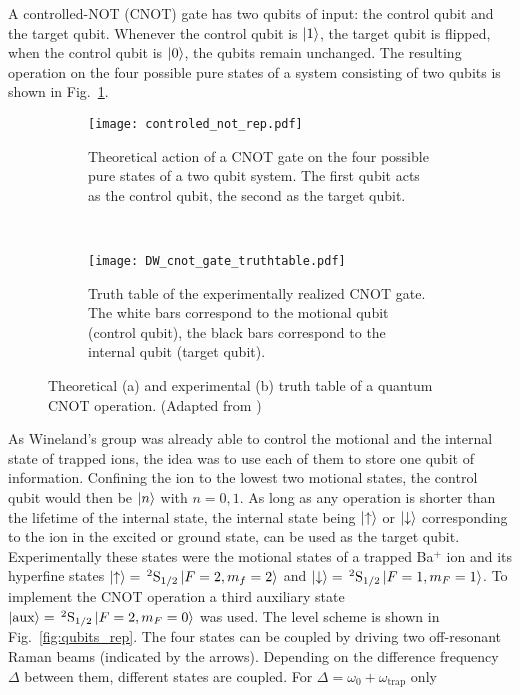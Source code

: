 A controlled-NOT (CNOT) gate has two qubits of input: the control qubit and the
target qubit. Whenever the control qubit is $\ket{1}$, the target qubit is
flipped, when the control qubit is $\ket{0}$, the qubits remain unchanged. The
resulting operation on the four possible pure states of a system consisting  of two qubits
is shown in Fig.~\ref{fig:cnot_theory}.
\begin{figure}[t]
  \centering
  \begin{subfigure}[t]{0.48\linewidth} 
    \centering
    \texttt{[image: controled\_not\_rep.pdf]}
    \caption{Theoretical action of a CNOT gate on the four possible pure states of a two
    qubit system. The first qubit acts as the control qubit, the second as the
  target qubit.}
    \label{fig:cnot_theory}
  \end{subfigure}
  ~
  \begin{subfigure}[t]{0.48\linewidth} 
    \centering
    \texttt{[image: DW\_cnot\_gate\_truthtable.pdf]}
    \caption{Truth table of the experimentally realized CNOT gate. The white bars
    correspond to the motional qubit (control qubit), the black bars correspond
  to the internal qubit (target qubit).}
    \label{fig:cnot_experiment}
  \end{subfigure}
  \caption{Theoretical (a) and experimental (b) truth table of a quantum CNOT
  operation. (Adapted from \cite{monroe1995demonstration})}
\end{figure}
As Wineland's group was already able to control the motional and the internal
state of trapped ions, the idea was to use each of them to store one qubit of
information. Confining the ion to the lowest two motional states, the control
qubit would then be $\ket{n}$ with $n=0,1$. As long as any operation is shorter
than the lifetime of the internal state, the internal state being
$\ket{\uparrow}$ or $\ket{\downarrow}$ corresponding to the ion in the
excited or ground state, can be used as the target qubit. Experimentally these
states were the motional states of a trapped Ba$^+$ ion and its hyperfine states
$\ket{\uparrow} =\, ^2\text{S}_{1/2}\ket{F=2, m_f=2}$ and $\ket{\downarrow} =
\,^2\text{S}_{1/2}\ket{F=1, m_F=1}$. To implement the CNOT operation a third
auxiliary state $\ket{\text{aux}} = \,^2\text{S}_{1/2}\ket{F=2, m_F=0}$ was
used. The level scheme is shown in Fig.~\ref{fig:qubits_rep}. The four states
can be coupled by driving two off-resonant Raman beams (indicated by the
arrows). Depending on the difference frequency $\Delta$ between them, different states
are coupled. For $\Delta = \omega_0 + \omega_\text{trap}$ only

